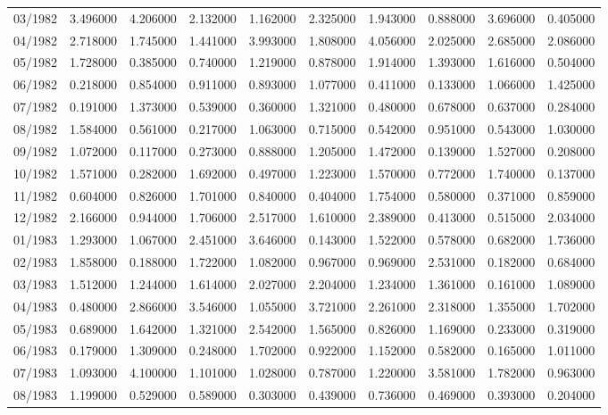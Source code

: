 \begin{tabular}{lrrrrrrrrr}
03/1982 & 3.496000 & 4.206000 & 2.132000 & 1.162000 & 2.325000 & 1.943000 & 0.888000 & 3.696000 & 0.405000 \\
04/1982 & 2.718000 & 1.745000 & 1.441000 & 3.993000 & 1.808000 & 4.056000 & 2.025000 & 2.685000 & 2.086000 \\
05/1982 & 1.728000 & 0.385000 & 0.740000 & 1.219000 & 0.878000 & 1.914000 & 1.393000 & 1.616000 & 0.504000 \\
06/1982 & 0.218000 & 0.854000 & 0.911000 & 0.893000 & 1.077000 & 0.411000 & 0.133000 & 1.066000 & 1.425000 \\
07/1982 & 0.191000 & 1.373000 & 0.539000 & 0.360000 & 1.321000 & 0.480000 & 0.678000 & 0.637000 & 0.284000 \\
08/1982 & 1.584000 & 0.561000 & 0.217000 & 1.063000 & 0.715000 & 0.542000 & 0.951000 & 0.543000 & 1.030000 \\
09/1982 & 1.072000 & 0.117000 & 0.273000 & 0.888000 & 1.205000 & 1.472000 & 0.139000 & 1.527000 & 0.208000 \\
10/1982 & 1.571000 & 0.282000 & 1.692000 & 0.497000 & 1.223000 & 1.570000 & 0.772000 & 1.740000 & 0.137000 \\
11/1982 & 0.604000 & 0.826000 & 1.701000 & 0.840000 & 0.404000 & 1.754000 & 0.580000 & 0.371000 & 0.859000 \\
12/1982 & 2.166000 & 0.944000 & 1.706000 & 2.517000 & 1.610000 & 2.389000 & 0.413000 & 0.515000 & 2.034000 \\
01/1983 & 1.293000 & 1.067000 & 2.451000 & 3.646000 & 0.143000 & 1.522000 & 0.578000 & 0.682000 & 1.736000 \\
02/1983 & 1.858000 & 0.188000 & 1.722000 & 1.082000 & 0.967000 & 0.969000 & 2.531000 & 0.182000 & 0.684000 \\
03/1983 & 1.512000 & 1.244000 & 1.614000 & 2.027000 & 2.204000 & 1.234000 & 1.361000 & 0.161000 & 1.089000 \\
04/1983 & 0.480000 & 2.866000 & 3.546000 & 1.055000 & 3.721000 & 2.261000 & 2.318000 & 1.355000 & 1.702000 \\
05/1983 & 0.689000 & 1.642000 & 1.321000 & 2.542000 & 1.565000 & 0.826000 & 1.169000 & 0.233000 & 0.319000 \\
06/1983 & 0.179000 & 1.309000 & 0.248000 & 1.702000 & 0.922000 & 1.152000 & 0.582000 & 0.165000 & 1.011000 \\
07/1983 & 1.093000 & 4.100000 & 1.101000 & 1.028000 & 0.787000 & 1.220000 & 3.581000 & 1.782000 & 0.963000 \\
08/1983 & 1.199000 & 0.529000 & 0.589000 & 0.303000 & 0.439000 & 0.736000 & 0.469000 & 0.393000 & 0.204000 \\

\end{tabular}
